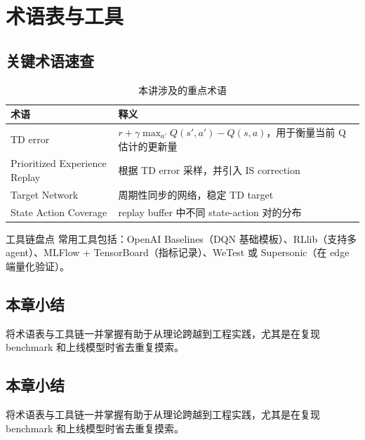 \section{术语表与工具}

\subsection{关键术语速查}

\begin{table}[H]
\centering
\begin{tabular}{lp{10cm}}
\toprule
术语 & 释义 \\
\midrule
TD error & $r + \gamma \max_{a'} Q(s', a') - Q(s, a)$，用于衡量当前 Q 估计的更新量 \\
Prioritized Experience Replay & 根据 TD error 采样，并引入 IS correction \\
Target Network & 周期性同步的网络，稳定 TD target \\
State Action Coverage & replay buffer 中不同 state-action 对的分布 \\
\bottomrule
\end{tabular}
\caption{本讲涉及的重点术语}
\end{table}

\begin{knowledgebox}{工具链盘点}
常用工具包括：OpenAI Baselines（DQN 基础模板）、RLlib（支持多 agent）、MLFlow + TensorBoard（指标记录）、WeTest 或 Supersonic（在 edge 端量化验证）。
\end{knowledgebox}

\subsection{本章小结}

将术语表与工具链一并掌握有助于从理论跨越到工程实践，尤其是在复现 benchmark 和上线模型时省去重复摸索。

 \subsection{本章小结}

将术语表与工具链一并掌握有助于从理论跨越到工程实践，尤其是在复现 benchmark 和上线模型时省去重复摸索。

